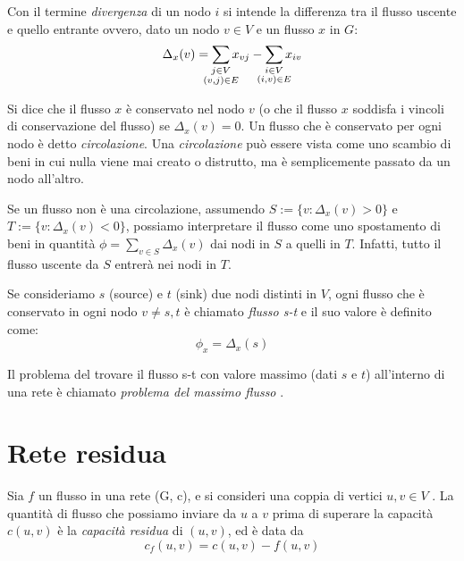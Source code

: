         Con il termine \textit{divergenza} di un nodo $i$ si intende la differenza tra il flusso uscente e quello entrante ovvero, dato un nodo $v \in V$ e un flusso $x$ in $G$:
        \begin{equation}
            \Delta_x(v) = \sum_{\mathclap{\substack{j \in V \\ (v,j) \in E}}}x_{vj} - \sum_{\mathclap{\substack{i \in V \\ (i,v) \in E}}}x_{iv}
        \end{equation}

        Si dice che il flusso $x$ è conservato nel nodo $v$ (o che il flusso $x$ soddisfa i vincoli di conservazione del flusso) se $\Delta_x(v) = 0$. Un flusso che è conservato per ogni nodo è detto \textit{circolazione}. Una \textit{circolazione} può essere vista come uno scambio di beni in cui nulla viene mai creato o distrutto, ma è semplicemente passato da un nodo all'altro.

        Se un flusso non è una circolazione, assumendo $S:=\{v : \Delta_x(v) > 0 \}$ e $T:=\{v : \Delta_x(v) < 0 \}$, possiamo interpretare il flusso come uno spostamento di beni in quantità $\phi = \sum_{v \in S} \Delta_x(v)$ dai nodi in $S$ a quelli in $T$. Infatti, tutto il flusso uscente da $S$ entrerà nei nodi in $T$.

        Se consideriamo $s$ (source) e $t$ (sink) due nodi distinti in $V$, ogni flusso che è conservato in ogni nodo $v \neq s,t$ è chiamato \textit{flusso s-t} e il suo valore è definito come:
        \begin{equation}
            \phi_x = \Delta_x(s)
        \end{equation}

        Il problema del trovare il flusso s-t con valore massimo (dati $s$ e $t$) all'interno di una rete è chiamato \textit{problema del massimo flusso} \cite{Lancia2022}.
        
    \section{Rete residua}
        Sia $f$ un flusso in una rete (G, c), e si consideri una coppia di vertici $u, v \in V$ . La quantità di flusso che possiamo inviare da $u$ a $v$ prima di superare la capacità $c(u, v)$ è la \textit{capacità residua} di $(u, v)$, ed è data da 
        \begin{equation}
            c_f (u, v) = c(u, v) - f(u, v)
        \end{equation}

